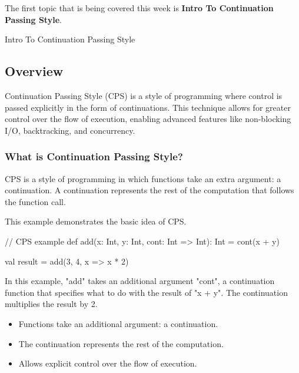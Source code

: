 The first topic that is being covered this week is \textbf{Intro To Continuation Passing Style}.

\begin{notes}{Intro To Continuation Passing Style}
    \subsection*{Overview}

    Continuation Passing Style (CPS) is a style of programming where control is passed explicitly in the form of continuations. This technique allows for greater control over the flow of execution, 
    enabling advanced features like non-blocking I/O, backtracking, and concurrency.
    
    \subsubsection*{What is Continuation Passing Style?}
    
    CPS is a style of programming in which functions take an extra argument: a continuation. A continuation represents the rest of the computation that follows the function call.
    
    \begin{highlight}
    
        This example demonstrates the basic idea of CPS.
    
    \begin{code}[Scala]
    // CPS example
    def add(x: Int, y: Int, cont: Int => Int): Int = cont(x + y)
    
    val result = add(3, 4, x => x * 2)
    \end{code}
    
        In this example, "add" takes an additional argument "cont", a continuation function that specifies what to do with the result of "x + y". The continuation multiplies the result by 2.
    
        \begin{itemize}
            \item Functions take an additional argument: a continuation.
            \item The continuation represents the rest of the computation.
            \item Allows explicit control over the flow of execution.
        \end{itemize}
    
    \end{highlight}
    

\end{notes}
